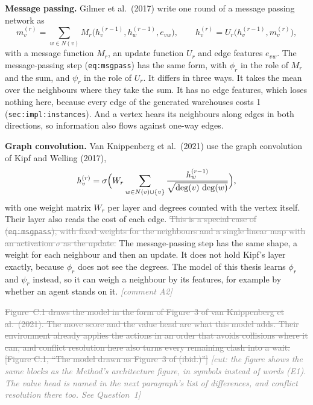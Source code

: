\documentclass[11pt,a4paper]{article}
\newcommand{\new}[1]{\textcolor{newc}{#1}}
\newcommand{\old}[1]{\textcolor{gray}{\sout{#1}}}
\newcommand{\lref}[1]{{\small\texttt{#1}}}
\newcommand{\cmt}[1]{{\small\textcolor{gray}{\emph{[comment #1]}}}}
\newcommand{\cut}[1]{{\small\textcolor{gray}{\emph{[cut: #1]}}}}
\begin{document}
\textbf{Message passing.} Gilmer et al.\ (2017) write one round of a message
passing network as
\begin{equation*}
  m_v^{(r)} = \sum_{w \in N(v)} M_r\bigl(h_v^{(r-1)}, h_w^{(r-1)}, e_{vw}\bigr),
  \qquad
  h_v^{(r)} = U_r\bigl(h_v^{(r-1)}, m_v^{(r)}\bigr),
\end{equation*}
with a message function $M_r$, an update function $U_r$ and edge features
$e_{vw}$. The message-passing step (\lref{eq:msgpass}) has the same form,
with $\phi_r$ in the role of $M_r$ and the sum, and $\psi_r$ in the role of
$U_r$. It differs in three ways. It takes the mean over the neighbours where
they take the sum. It has no edge features, which loses nothing here,
because every edge of the generated warehouses costs 1
(\lref{sec:impl:instances}). And a vertex hears its neighbours along edges in
both directions, so information also flows against one-way edges.

\textbf{Graph convolution.} Van Knippenberg et al.\ (2021) use the graph
convolution of Kipf and Welling (2017),
\begin{equation*}
  h_v^{(r)} = \sigma\Bigl( W_r \sum_{w \in N(v) \cup \{v\}}
    \frac{h_w^{(r-1)}}{\sqrt{\deg(v)\,\deg(w)}} \Bigr),
\end{equation*}
with one weight matrix $W_r$ per layer and degrees counted with the vertex
itself. \new{Their layer also reads the cost of each edge.} \old{This is a
special case of (\lref{eq:msgpass}), with fixed weights for the neighbours
and a single linear map with an activation $\sigma$ as the update.}
\new{The message-passing step has the same shape, a weight for each
neighbour and then an update. It does not hold Kipf's layer exactly, because
$\phi_r$ does not see the degrees.} The model of this thesis learns $\phi_r$
and $\psi_r$ instead, so it can weigh a neighbour by its features, for
example by whether an agent stands on it. \hfill\cmt{A2}

\old{Figure~C.1 draws the model in the form of Figure~3 of van Knippenberg et
al.\ (2021). The move score and the value head are what this model adds.
Their environment already applies the actions in an order that avoids
collisions where it can, and conflict resolution here also turns every
remaining clash into a wait.} \old{[Figure C.1, ``The model drawn as Figure~3
of (ibid.)'']} \cut{the figure shows the same blocks as the Method's
architecture figure, in symbols instead of words (E1). The value head is
named in the next paragraph's list of differences, and conflict resolution
there too. See Question~1}
\end{document}
